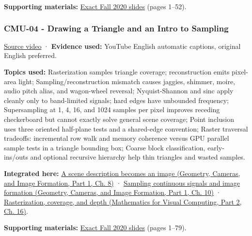 \textbf{Supporting materials:} \href{https://15462.courses.cs.cmu.edu/fall2020content/lectures/03_vectorcalc/03_vectorcalc_slides.pdf}{Exact Fall 2020 slides} (pages 1--52).

\subsubsection{CMU-04 - Drawing a Triangle and an Intro to Sampling}\label{04-visual-computing-ii-ch036-cmu-04---drawing-a-triangle-and-an-intro-to-sampling}

\hypertarget{04-visual-computing-ii-ch036-cmu-04---drawing-a-triangle-and-an-intro-to-sampling}{}

\href{https://www.youtube.com/watch?v=B0hsT2npIc0}{Source video} · \textbf{Evidence used:} YouTube English automatic captions, original English preferred.

\textbf{Topics used:} Rasterization samples triangle coverage; reconstruction emits pixel-area light; Sampling/reconstruction mismatch causes jaggies, shimmer, moire, audio pitch alias, and wagon-wheel reversal; Nyquist-Shannon and sinc apply cleanly only to band-limited signals; hard edges have unbounded frequency; Supersampling at 1, 4, 16, and 1024 samples per pixel improves receding checkerboard but cannot exactly solve general scene coverage; Point inclusion uses three oriented half-plane tests and a shared-edge convention; Raster traversal tradeoffs: incremental row walk and memory coherence versus GPU parallel sample tests in a triangle bounding box; Coarse block classification, early-ins/outs and optional recursive hierarchy help thin triangles and wasted samples.

\textbf{Integrated here:} \href{../03-Geometry-Cameras-and-Image-Formation-P01/main.pdf\#03-visual-computing-i-ch001-a-scene-description-becomes-an-image}{A scene description becomes an image (Geometry, Cameras, and Image Formation, Part 1, Ch. 8)} · \href{../03-Geometry-Cameras-and-Image-Formation-P01/main.pdf\#03-visual-computing-i-ch003-sampling-continuous-signals-and-image-formation}{Sampling continuous signals and image formation (Geometry, Cameras, and Image Formation, Part 1, Ch. 10)} · \href{../02-Mathematics-for-Visual-Computing-P02/main.pdf\#03-visual-computing-i-ch012-rasterization-coverage-and-depth}{Rasterization, coverage, and depth (Mathematics for Visual Computing, Part 2, Ch. 16)}.

\textbf{Supporting materials:} \href{https://15462.courses.cs.cmu.edu/fall2020content/lectures/04_drawingatriangle/04_drawingatriangle_slides.pdf}{Exact Fall 2020 slides} (pages 1--79).

